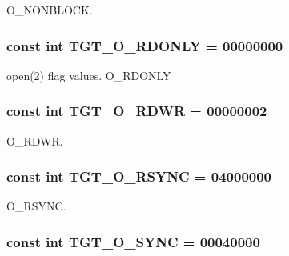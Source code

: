 O\_\-NONBLOCK. \hypertarget{classAlphaTru64_ad266b23a0ae07d1833e18bae651f3411}{
\subsubsection[{TGT\_\-O\_\-RDONLY}]{\setlength{\rightskip}{0pt plus 5cm}const int {\bf TGT\_\-O\_\-RDONLY} = 00000000}}
\label{classAlphaTru64_ad266b23a0ae07d1833e18bae651f3411}


open(2) flag values. O\_\-RDONLY \hypertarget{classAlphaTru64_ac6fa9ecf5d2f3314f197698f1099e2ac}{
\subsubsection[{TGT\_\-O\_\-RDWR}]{\setlength{\rightskip}{0pt plus 5cm}const int {\bf TGT\_\-O\_\-RDWR} = 00000002}}
\label{classAlphaTru64_ac6fa9ecf5d2f3314f197698f1099e2ac}


O\_\-RDWR. \hypertarget{classAlphaTru64_a1b4245158ffbfdc36ae7d6e666ffc261}{
\subsubsection[{TGT\_\-O\_\-RSYNC}]{\setlength{\rightskip}{0pt plus 5cm}const int {\bf TGT\_\-O\_\-RSYNC} = 04000000}}
\label{classAlphaTru64_a1b4245158ffbfdc36ae7d6e666ffc261}


O\_\-RSYNC. \hypertarget{classAlphaTru64_abf43ab05d2a5b6b8113952160d8565db}{
\subsubsection[{TGT\_\-O\_\-SYNC}]{\setlength{\rightskip}{0pt plus 5cm}const int {\bf TGT\_\-O\_\-SYNC} = 00040000}}
\label{classAlphaTru64_abf43ab05d2a5b6b8113952160d8565db}


